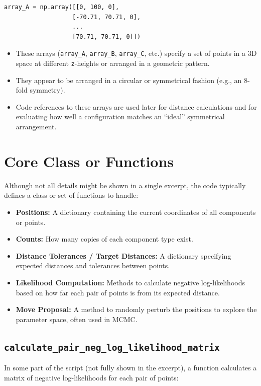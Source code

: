 \documentclass[12pt]{article}
\begin{document}
\begin{lstlisting}
array_A = np.array([[0, 100, 0],
                   [-70.71, 70.71, 0],
                   ...
                   [70.71, 70.71, 0]])
\end{lstlisting}

\begin{itemize}
  \item These arrays (\texttt{array\_A}, \texttt{array\_B}, \texttt{array\_C}, etc.) specify a set of points in a 3D space at different \texttt{z}-heights or arranged in a geometric pattern.
  \item They appear to be arranged in a circular or symmetrical fashion (e.g., an 8-fold symmetry).
  \item Code references to these arrays are used later for distance calculations and for evaluating how well a configuration matches an “ideal” symmetrical arrangement.
\end{itemize}

\section{Core Class or Functions}

Although not all details might be shown in a single excerpt, the code typically defines a class or set of functions to handle:

\begin{itemize}
  \item \textbf{Positions:} A dictionary containing the current coordinates of all components or points.
  \item \textbf{Counts:} How many copies of each component type exist.
  \item \textbf{Distance Tolerances / Target Distances:} A dictionary specifying expected distances and tolerances between points.
  \item \textbf{Likelihood Computation:} Methods to calculate negative log-likelihoods based on how far each pair of points is from its expected distance.
  \item \textbf{Move Proposal:} A method to randomly perturb the positions to explore the parameter space, often used in MCMC.
\end{itemize}

\subsection{\texttt{calculate\_pair\_neg\_log\_likelihood\_matrix}}
In some part of the script (not fully shown in the excerpt), a function calculates a matrix of negative log-likelihoods for each pair of points:
\end{document}
